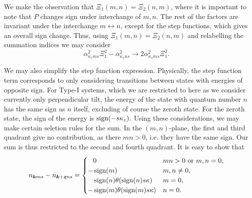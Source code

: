 We make the observation that \( \Xi _1(m, n) = \Xi _2(n, m) \), where it is important to note that \( P \) changes sign under interchange of \( m,n \).
The rest of the factors are invariant under the interchange \( m \leftrightarrow n \), except for the step functions, which gives an overall sign change.
Thus, using \( \Xi _1(m, n) = \Xi _2(n, m) \) and relabelling the summation indices we may consider
\[
  \alpha_{\kappa_z m s}^2 \Xi_1^2 - \alpha_{\kappa_z n s}^2 \to 2 \alpha_{\kappa_z m s}^2 \Xi_1^2.
\]

We may also simplify the step function expression.
Physically, the step function term corresponds to only considering transitions between states with energies of opposite sign.
For Type-I systems, which we are restricted to here as we consider currently only perpendicular tilt, the energy of the state with quantum number \( n \) has the same sign as \( n \) itself, excluding of course the zeroth state.
For the zeroth state, the sign of the energy is \( \operatorname{sign}(-s \kappa_z) \).
Using these considerations, we may make certain seletion rules for the sum.
In the \( (m,n) \)-plane, the first and third quadrant give no contribution, as there \( m n > 0 \), i.e. they have the same sign.
Our sum is thus restricted to the second and fourth quadrant.
It is easy to show that
\begin{equation}
  \label{eq:102}
  n_{\bm{k} m s} - n_{\bm{k} + \mathfrak{q} n s} =
  \begin{cases}
    \phantom{-} 0 & m n > 0 \text{ or  } m,n = 0,\\
    - \operatorname{sign}(m) & m,n \neq 0,\\
    \phantom{-} \operatorname{sign}(n) \theta(\operatorname{sign}(n) s \kappa) & m = 0,\\
    -\operatorname{sign}(m) \theta(\operatorname{sign}(m) s \kappa) & n = 0.
  \end{cases}
\end{equation}

